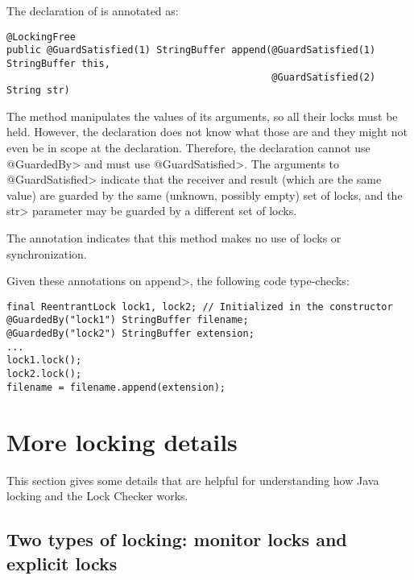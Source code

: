 The declaration of
is annotated as:

\begin{verbatim}
@LockingFree
public @GuardSatisfied(1) StringBuffer append(@GuardSatisfied(1) StringBuffer this,
                                              @GuardSatisfied(2) String str)
\end{verbatim}

The method manipulates the values of its arguments, so all their locks must
be held.  However, the declaration does not know what those are and they
might not even be in scope at the declaration.  Therefore, the declaration
cannot use \<@GuardedBy> and must use \<@GuardSatisfied>.  The arguments to
\<@GuardSatisfied> indicate that the receiver and result (which are the
same value) are guarded by the same (unknown, possibly empty) set of locks,
and the \<str> parameter may be guarded by a different set of locks.

The  annotation indicates that
this method makes no use of
locks or synchronization.

Given these annotations on \<append>, the following code type-checks:

\begin{verbatim}
final ReentrantLock lock1, lock2; // Initialized in the constructor
@GuardedBy("lock1") StringBuffer filename;
@GuardedBy("lock2") StringBuffer extension;
...
lock1.lock();
lock2.lock();
filename = filename.append(extension);
\end{verbatim}




\section{More locking details\label{lock-details}}

This section gives some details that are helpful for understanding how Java
locking and the Lock Checker works.

\subsection{Two types of locking:  monitor locks and explicit locks\label{lock-two-types}}

